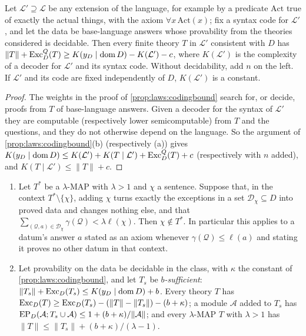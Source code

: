 \begin{proposition}\label{prop:laws:trivial}
Let $\mathcal L'\supseteq\mathcal L$ be any extension of the language, for example by a predicate $\mathrm{Act}$ true of exactly the actual things, with the axiom $\forall x\,\mathrm{Act}(x)$; fix a syntax code for $\mathcal L'$, and let the data be base-language answers whose provability from the theories considered is decidable. Then every finite theory $T$ in $\mathcal L'$ consistent with $D$ has $\lVert T\rVert+\mathrm{Exc}^Q_D(T)\ge K(y_D\mid\operatorname{dom} D)-K(\mathcal L')-c$, where $K(\mathcal L')$ is the complexity of a decoder for $\mathcal L'$ and its syntax code. Without decidability, add $n$ on the left. If $\mathcal L'$ and its code are fixed independently of $D$, $K(\mathcal L')$ is a constant.
\end{proposition}

\begin{proof}
The weights in the proof of \cref{prop:laws:codingbound} search for, or decide, proofs from $T$ of base-language answers. Given a decoder for the syntax of $\mathcal L'$ they are computable (respectively lower semicomputable) from $T$ and the questions, and they do not otherwise depend on the language. So the argument of \cref{prop:laws:codingbound}(b) (respectively (a)) gives $K(y_D\mid\operatorname{dom} D)\le K(\mathcal L')+K(T\mid\mathcal L')+\mathrm{Exc}^Q_D(T)+c$ (respectively with $n$ added), and $K(T\mid\mathcal L')\le\lVert T\rVert+c$.
\end{proof}

\begin{proposition}\label{prop:laws:once}
\leavevmode
\begin{enumerate}[label=(\alph*),itemsep=1pt,topsep=2pt]
\item Let $T^*$ be a $\lambda$-MAP with $\lambda>1$ and $\chi$ a sentence. Suppose that, in the context $T^*\setminus\{\chi\}$, adding $\chi$ turns exactly the exceptions in a set $\mathcal D_\chi\subseteq D$ into proved data and changes nothing else, and that $\sum_{(\mathcal Q,a)\in\mathcal D_\chi}\gamma(\mathcal Q)<\lambda\ell(\chi)$. Then $\chi\notin T^*$. In particular this applies to a datum's answer $a$ stated as an axiom whenever $\gamma(\mathcal Q)\le\ell(a)$ and stating it proves no other datum in that context.
\item Let provability on the data be decidable in the class, with $\kappa$ the constant of \cref{prop:laws:codingbound}, and let $T_s$ be \emph{$b$-sufficient}: $\lVert T_s\rVert+\mathrm{Exc}_D(T_s)\le K(y_D\mid\operatorname{dom} D)+b$. Every theory $T$ has $\mathrm{Exc}_D(T)\ge\mathrm{Exc}_D(T_s)-(\lVert T\rVert-\lVert T_s\rVert)-(b+\kappa)$; a module $\mathcal A$ added to $T_s$ has $\mathrm{EP}_D(\mathcal A;T_s\cup\mathcal A)\le1+(b+\kappa)/\lVert\mathcal A\rVert$; and every $\lambda$-MAP $T$ with $\lambda>1$ has $\lVert T\rVert\le\lVert T_s\rVert+(b+\kappa)/(\lambda-1)$.
\end{enumerate}
\end{proposition}

